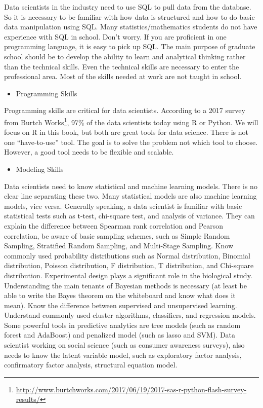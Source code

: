 \documentclass[12pt,]{krantz}
\providecommand{\tightlist}{%
  \setlength{\itemsep}{0pt}\setlength{\parskip}{0pt}}
\renewcommand{\href}[2]{#2\footnote{\url{#1}}}
\theoremstyle{definition}
\theoremstyle{definition}
\theoremstyle{remark}
\begin{document}
Data scientists in the industry need to use SQL to pull data from the
database. So it is necessary to be familiar with how data is structured
and how to do basic data manipulation using SQL. Many
statistics/mathematics students do not have experience with SQL in
school. Don't worry. If you are proficient in one programming language,
it is easy to pick up SQL. The main purpose of graduate school should be
to develop the ability to learn and analytical thinking rather than the
technical skills. Even the technical skills are necessary to enter the
professional area. Most of the skills needed at work are not taught in
school.

\begin{itemize}
\tightlist
\item
  Programming Skills
\end{itemize}

Programming skills are critical for data scientists. According to a 2017
survey from
\href{http://www.burtchworks.com/2017/06/19/2017-sas-r-python-flash-survey-results/}{Burtch
Works}, 97\% of the data scientists today using R or Python. We will
focus on R in this book, but both are great tools for data science.
There is not one ``have-to-use'' tool. The goal is to solve the problem
not which tool to choose. However, a good tool needs to be flexible and
scalable.

\begin{itemize}
\tightlist
\item
  Modeling Skills
\end{itemize}

Data scientists need to know statistical and machine learning models.
There is no clear line separating these two. Many statistical models are
also machine learning models, vice versa. Generally speaking, a data
scientist is familiar with basic statistical tests such as t-test,
chi-square test, and analysis of variance. They can explain the
difference between Spearman rank correlation and Pearson correlation, be
aware of basic sampling schemes, such as Simple Random Sampling,
Stratified Random Sampling, and Multi-Stage Sampling. Know commonly used
probability distributions such as Normal distribution, Binomial
distribution, Poisson distribution, F distribution, T distribution, and
Chi-square distribution. Experimental design plays a significant role in
the biological study. Understanding the main tenants of Bayesian methods
is necessary (at least be able to write the Bayes theorem on the
whiteboard and know what does it mean). Know the difference between
supervised and unsupervised learning. Understand commonly used cluster
algorithms, classifiers, and regression models. Some powerful tools in
predictive analytics are tree models (such as random forest and
AdaBoost) and penalized model (such as lasso and SVM). Data scientist
working on social science (such as consumer awareness surveys), also
needs to know the latent variable model, such as exploratory factor
analysis, confirmatory factor analysis, structural equation model.
\end{document}

